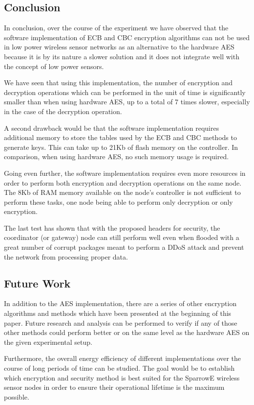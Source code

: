 \subsection{Conclusion}
In conclusion, over the course of the experiment we have observed that the 
software implementation of ECB and CBC encryption algorithms can not be used in low 
power wireless sensor networks as an alternative to the hardware AES because it 
is by its nature a slower solution and it does not integrate well with the 
concept of low power sensors.

We have seen that using this implementation, the number of encryption 
and decryption operations which can be performed in the unit of time 
is significantly smaller than when using hardware AES, up to a total 
of 7 times slower, especially in the case of the decryption operation.

A second drawback would be that the software implementation requires 
additional memory to store the tables used by the ECB and CBC methods 
to generate keys. This can take up to 21Kb of flash memory on the controller.
In comparison, when using hardware AES, no such memory usage is required.

Going even further, the software implementation requires even more resources 
in order to perform both encryption and decryption operations on the same node. The 8Kb of 
RAM memory available on the node's controller is not sufficient to perform these tasks, one node
being able to perform only decryption or only encryption.

The last test has shown that with the proposed headers for security, the coordinator (or 
gateway) node can still perform well even when flooded with a great number of corrupt 
packages meant to perform a DDoS attack and prevent the network from processing 
proper data.

\subsection{Future Work}
In addition to the AES implementation, there are a series of other encryption algorithms 
and methods which have been presented at the beginning of this paper. Future research and 
analysis can be performed to verify if any of those other methods could perform better or on 
the same level as the hardware AES on the given experimental setup.

Furthermore, the overall energy efficiency of different implementations over the course of 
long periods of time can be studied. The goal would be to establish which encryption and 
security method is best suited for the SparrowE wireless sensor nodes in order to ensure 
their operational lifetime is the maximum possible.
